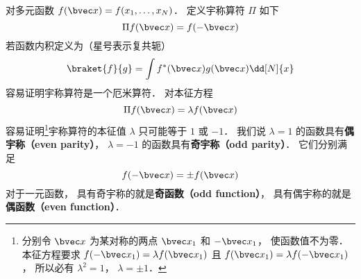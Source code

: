 

对多元函数 $f(\bvec x) = f(x_1, \dots, x_N)$．  定义宇称算符 $\Pi$ 如下
\begin{equation}
\Pi f(\bvec x) = f(-\bvec x)
\end{equation}
若函数内积定义为（星号表示复共轭）
\begin{equation}
\braket{f}{g} = \int f^*(\bvec x) g(\bvec x) \dd[N]{x}
\end{equation}
容易证明宇称算符是一个厄米算符．%
对本征方程
\begin{equation}
\Pi f(\bvec x) = \lambda f(\bvec x)
\end{equation}
容易证明\footnote{分别令 $\bvec x$ 为某对称的两点 $\bvec x_1$ 和 $-\bvec x_1$， 使函数值不为零． 本征方程要求 $f(-\bvec x_1) = \lambda f(\bvec x_1)$ 且 $f(\bvec x_1) = \lambda f(-\bvec x_1)$， 所以必有 $\lambda^2 = 1$， $\lambda = \pm 1$．}宇称算符的本征值 $\lambda$ 只可能等于 $1$ 或 $-1$． 我们说 $\lambda = 1$ 的函数具有\textbf{偶宇称（even parity）}， $\lambda = -1$ 的函数具有\textbf{奇宇称（odd parity）}． 它们分别满足
\begin{equation}
f(-\bvec x) = \pm f(\bvec x)
\end{equation}
对于一元函数， 具有奇宇称的就是\textbf{奇函数（odd function）}， 具有偶宇称的就是\textbf{偶函数（even function）}．
